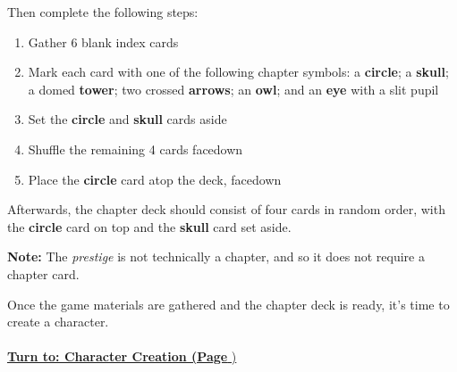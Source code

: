 \documentclass[12pt]{article}
\begin{document}
\begin{multicols*}{2}
Then complete the following steps:

\begin{enumerate}
\item Gather 6 blank index cards
\item Mark each card with one of the following chapter symbols: a \textbf{circle}; a \textbf{skull}; a domed \textbf{tower}; two crossed \textbf{arrows}; an \textbf{owl}; and an \textbf{eye} with a slit pupil 
\item Set the \textbf{circle} and \textbf{skull} cards aside
\item Shuffle the remaining 4 cards facedown
\item Place the \textbf{circle} card atop the deck, facedown
\end{enumerate}

Afterwards, the chapter deck should consist of four cards in random order, with the \textbf{circle} card on top and the \textbf{skull} card set aside.
\begin{tcolorbox}
\textbf{Note:} The \emph{prestige} is not technically a chapter, and so it does not require a chapter card.
\end{tcolorbox}
Once the game materials are gathered and the chapter deck is ready, it’s time to create a character.\\
\ \\
\hyperlink{chargen}{\textbf{Turn to: Character Creation (Page \pageref{chargen}})}


\end{multicols*}
\end{document}
